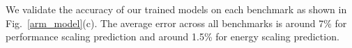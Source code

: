 

We validate the accuracy of our trained models on each benchmark as shown in Fig.~\ref{arm_model}(c). The average error across all benchmarks is around 7\% for performance scaling prediction and around 1.5\% for energy scaling prediction. 


